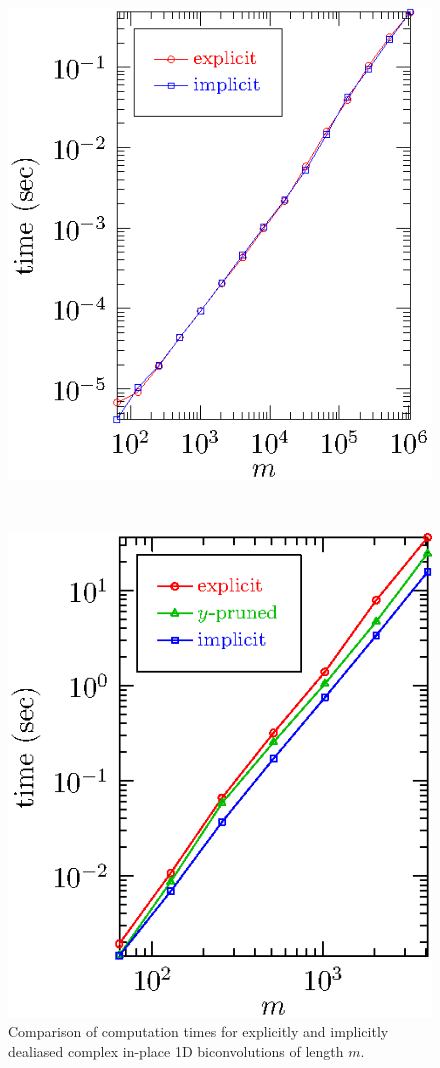 \documentclass[final]{siamltex}
\begin{document}
\begin{figure}[htbp]
\begin{minipage}{0.49\linewidth}
\begin{center}
\includegraphics{timing1b}
\caption{Comparison of computation times for explicitly and implicitly
dealiased complex in-place 1D biconvolutions of length $m$.}
\label{timing1b}
\end{center}
\end{minipage}
\,
\begin{minipage}{0.49\linewidth}
\begin{center}
\includegraphics{timing2b}

\end{center}
\end{minipage}
\end{figure}
\end{document}
